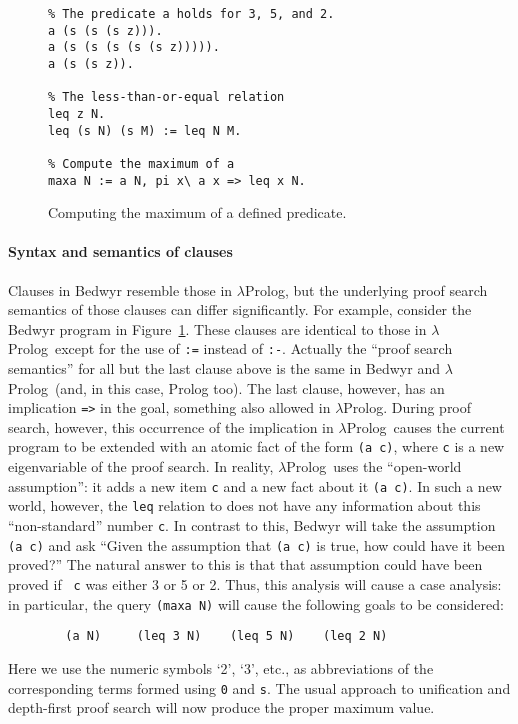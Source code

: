 \documentclass{article}
\newcommand{\lp}{$\lambda$Prolog}
\begin{document}
\begin{figure}
\begin{verbatim}
% The predicate a holds for 3, 5, and 2.
a (s (s (s z))).
a (s (s (s (s (s z))))).
a (s (s z)).

% The less-than-or-equal relation
leq z N.
leq (s N) (s M) := leq N M.

% Compute the maximum of a
maxa N := a N, pi x\ a x => leq x N.
\end{verbatim}
\caption{Computing the maximum of a defined predicate.}
\label{maxa}
\end{figure}

\paragraph{Syntax and semantics of clauses}
Clauses in Bedwyr resemble those in \lp, but the underlying proof
search semantics of those clauses can differ significantly.  For example,
consider the Bedwyr program in Figure~\ref{maxa}.  These clauses are
identical to those in \lp\ except for the use of \verb+:=+ instead of
\verb+:-+.  Actually the ``proof search semantics'' for all but the
last clause above is the same in Bedwyr and \lp\ (and, in this case,
Prolog too).  The last clause, however, has an implication \verb+=>+
in the goal, something also allowed in \lp.  During proof search,
however, this occurrence of the implication in \lp\ causes the current
program to be extended with an atomic fact of the form \verb+(a c)+,
where {\tt c} is a new eigenvariable of the proof search.  In reality,
\lp\ uses the ``open-world assumption'': it adds a new item {\tt c}
and a new fact about it {\tt (a c)}.  In such a new world, however, the 
{\tt leq} relation to does not have any information about this
``non-standard'' number {\tt c}.  In contrast to this, Bedwyr will
take the assumption  {\tt (a c)} and ask ``Given the assumption that 
{\tt (a c)} is true, how could have it been proved?''  The natural
answer to this is that that assumption could have been proved if {\tt
c} was either 3 or 5 or 2.  Thus, this analysis will cause a case
analysis: in particular, the query {\tt (maxa N)} will cause the
following goals to be considered:
\begin{verbatim}
        (a N)     (leq 3 N)    (leq 5 N)    (leq 2 N)
\end{verbatim}
Here we use the numeric symbols `2', `3', etc., as abbreviations of
the corresponding terms formed using \texttt{0} and \texttt{s}.
The usual approach to unification and depth-first proof search will
now produce the proper maximum value.
\end{document}
